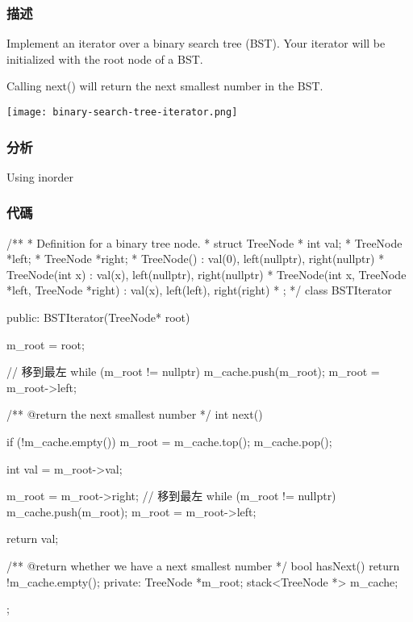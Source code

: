 \subsubsection{描述}
Implement an iterator over a binary search tree (BST). Your iterator will be initialized with the root node of a BST.

Calling next() will return the next smallest number in the BST.

\begin{center}
\texttt{[image: binary-search-tree-iterator.png]}\\
\label{fig:binary-search-tree-iterator}
\end{center}

\subsubsection{分析}
Using inorder

\subsubsection{代碼}
\begin{Code}
/**
 * Definition for a binary tree node.
 * struct TreeNode {
 *     int val;
 *     TreeNode *left;
 *     TreeNode *right;
 *     TreeNode() : val(0), left(nullptr), right(nullptr) {}
 *     TreeNode(int x) : val(x), left(nullptr), right(nullptr) {}
 *     TreeNode(int x, TreeNode *left, TreeNode *right) : val(x), left(left), right(right) {}
 * };
 */
class BSTIterator {
public:
    BSTIterator(TreeNode* root) {
        m_root = root;

        // 移到最左
        while (m_root != nullptr)
        {
            m_cache.push(m_root);
            m_root = m_root->left;
        }
    }

    /** @return the next smallest number */
    int next() {
        if (!m_cache.empty())
        {
            m_root = m_cache.top();
            m_cache.pop();
        }

        int val = m_root->val;

        m_root = m_root->right;
        // 移到最左
        while (m_root != nullptr)
        {
            m_cache.push(m_root);
            m_root = m_root->left;
        }

        return val;
    }

    /** @return whether we have a next smallest number */
    bool hasNext() {
        return !m_cache.empty();
    }
private:
    TreeNode *m_root;
    stack<TreeNode *> m_cache;
};
\end{Code}

